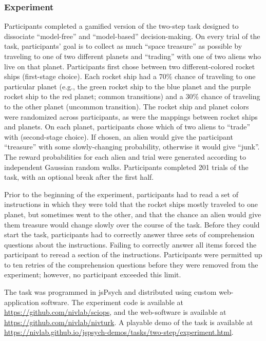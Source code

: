 \documentclass[a4paper,notitlepage,12pt]{article}
\begin{document}
\subsubsection*{Experiment}

Participants completed a gamified version of the two-step task \cite{daw2011model} designed to dissociate ``model-free'' and ``model-based'' decision-making. On every trial of the task, participants' goal is to collect as much ``space treasure'' as possible by traveling to one of two different planets and ``trading'' with one of two aliens who live on that planet. Participants first chose between two different-colored rocket ships (first-stage choice). Each rocket ship had a 70\% chance of traveling to one particular planet (e.g., the green rocket ship to the blue planet and the purple rocket ship to the red planet; common transitions) and a 30\% chance of traveling to the other planet (uncommon transition). The rocket ship and planet colors were randomized across participants, as were the mappings between rocket ships and planets. On each planet, participants chose which of two aliens to ``trade'' with (second-stage choice). If chosen, an alien would give the participant ``treasure'' with some slowly-changing probability, otherwise it would give ``junk''. The reward probabilities for each alien and trial were generated according to independent Gaussian random walks. Participants completed 201 trials of the task, with an optional break after the first half. 

Prior to the beginning of the experiment, participants had to read a set of instructions in which they were told that the rocket ships mostly traveled to one planet, but sometimes went to the other, and that the chance an alien would give them treasure would change slowly over the course of the task. Before they could start the task, participants had to correctly answer three sets of comprehension questions about the instructions. Failing to correctly answer all items forced the participant to reread a section of the instructions. Participants were permitted up to ten retries of the comprehension questions before they were removed from the experiment; however, no participant exceeded this limit. 

The task was programmed in jsPsych \cite{deleeuw_2015_jspsych-2} and distributed using custom web-application software. The experiment code is available at \url{https://github.com/nivlab/sciops}, and the web-software is available at \url{https://github.com/nivlab/nivturk}. A playable demo of the task is available at \url{https://nivlab.github.io/jspsych-demos/tasks/two-step/experiment.html}.
\end{document}

